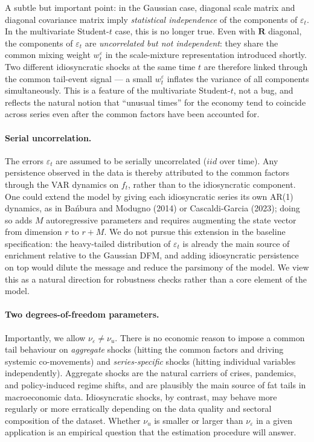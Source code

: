 \documentclass[11pt, a4paper, oneside]{article}
\newcommand{\mR}{\mathbf{R}}
\begin{document}
A subtle but important point: in the Gaussian case, diagonal scale
matrix and diagonal covariance matrix imply \emph{statistical
independence} of the components of $\varepsilon_t$. In the
multivariate Student-$t$ case, this is no longer true. Even with
$\mR$ diagonal, the components of $\varepsilon_t$ are
\emph{uncorrelated but not independent}: they share the common
mixing weight $w^\varepsilon_t$ in the scale-mixture representation
introduced shortly. Two different idiosyncratic shocks at the same
time $t$ are therefore linked through the common tail-event signal —
a small $w^\varepsilon_t$ inflates the variance of all components
simultaneously. This is a feature of the multivariate Student-$t$,
not a bug, and reflects the natural notion that ``unusual times'' for
the economy tend to coincide across series even after the common
factors have been accounted for.

\paragraph{Serial uncorrelation.}
The errors $\varepsilon_t$ are assumed to be serially uncorrelated
($iid$ over time). Any persistence observed in the data is thereby
attributed to the common factors through the VAR dynamics on $f_t$,
rather than to the idiosyncratic component. One could extend the
model by giving each idiosyncratic series its own AR(1) dynamics, as
in Bańbura and Modugno (2014) or Cascaldi-Garcia (2023); doing so
adds $M$ autoregressive parameters and requires augmenting the state
vector from dimension $r$ to $r + M$. We do not pursue this extension
in the baseline specification: the heavy-tailed distribution of
$\varepsilon_t$ is already the main source of enrichment relative to
the Gaussian DFM, and adding idiosyncratic persistence on top would
dilute the message and reduce the parsimony of the model. We view
this as a natural direction for robustness checks rather than a core
element of the model.

\paragraph{Two degrees-of-freedom parameters.}
Importantly, we allow $\nu_\varepsilon \neq \nu_u$. There is no
economic reason to impose a common tail behaviour on \emph{aggregate}
shocks (hitting the common factors and driving systemic co-movements)
and \emph{series-specific} shocks (hitting individual variables
independently). Aggregate shocks are the natural carriers of crises,
pandemics, and policy-induced regime shifts, and are plausibly the
main source of fat tails in macroeconomic data. Idiosyncratic shocks,
by contrast, may behave more regularly or more erratically depending
on the data quality and sectoral composition of the dataset. Whether
$\nu_u$ is smaller or larger than $\nu_\varepsilon$ in a given
application is an empirical question that the estimation procedure
will answer.
\end{document}
